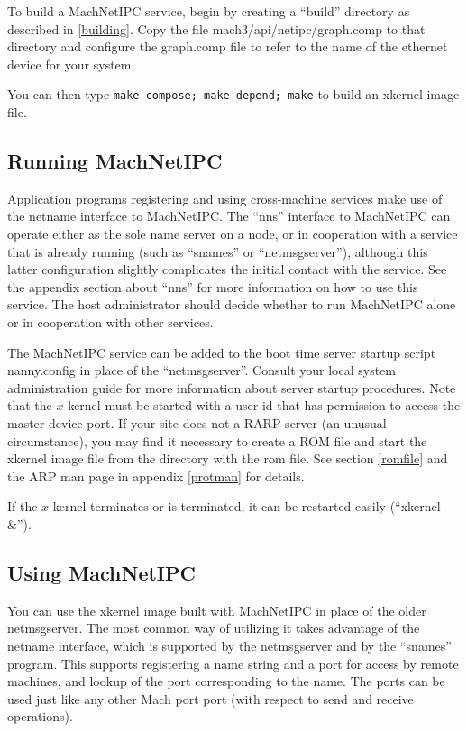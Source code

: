 To build a MachNetIPC service, begin by creating a ``build'' directory
as described in \ref{building}.  Copy the file 
{\sanss mach3/api/netipc/graph.comp}
to that directory and configure the graph.comp file to refer to the
name of the ethernet device for your system.

You can then type {\tt make compose; make depend; make} to build an
xkernel image file.  

\subsection{Running MachNetIPC}

Application programs registering and using cross-machine services make
use of the netname interface to MachNetIPC.  The ``nns'' interface to
MachNetIPC can operate either as the sole name server on a node, or in
cooperation with a service that is already running (such as ``snames''
or ``netmsgserver''), although this latter configuration slightly
complicates the initial contact with the service.  See the appendix
section about ``nns'' for more information on how to use this service.
The host administrator should decide whether to run MachNetIPC alone
or in cooperation with other services.

The MachNetIPC service can be added to the boot time server startup
script {\sanss nanny.config} in place of the ``netmsgserver''.  Consult
your local system administration guide for more information about
server startup procedures.  Note that the $x$\/-kernel must be started
with a user id that has permission to access the master device port.
If your site does not a RARP server (an unusual circumstance), you may
find it necessary to create a ROM file and start the xkernel image file
from the directory with the rom file.  See section \ref{romfile} and
the ARP man page in appendix \ref{protman} for details.

If the $x$\/-kernel terminates or is terminated, it can be restarted
easily (``xkernel \&'').

\subsection{Using MachNetIPC}

You can use the xkernel image built with MachNetIPC in place of the older
netmsgserver.  The most common way of utilizing it takes advantage of
the netname interface, which is supported by the netmsgserver and by
the ``snames'' program.  This supports registering a name string and a
port for access by remote machines, and lookup of the port
corresponding to the name.  The ports can be used just like any other
Mach port port (with respect to send and receive operations).

